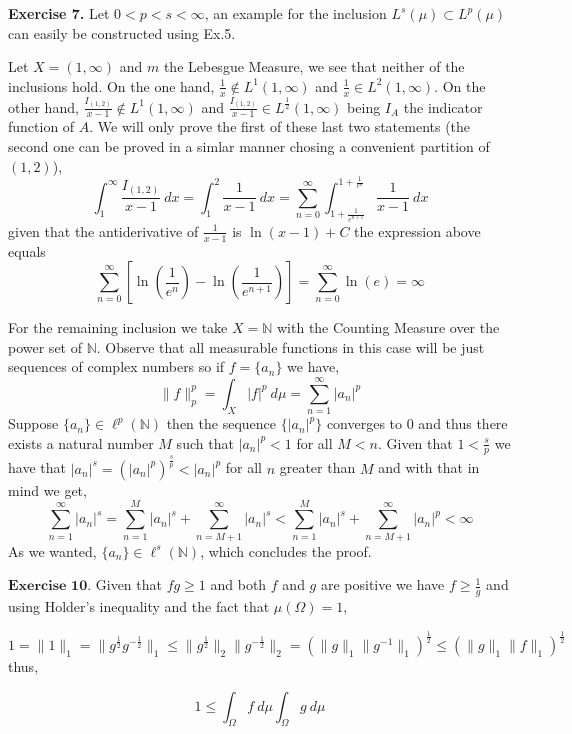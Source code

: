 \documentclass{article}
\begin{document}
\begin{exercise}\textbf{Exercise 7.}
    Let $0 < p < s < \infty$, an example for the inclusion $L^s \left(  \mu\right)  \subset L^p \left( \mu \right) $ can easily be constructed using Ex.5.

    Let $X = \left( 1, \infty \right) $ and $m$ the Lebesgue Measure, we see that neither of the inclusions hold. On the one hand, $\frac{1}{x} \notin L^1 \left( 1, \infty \right)$ and $\frac{1}{x} \in L^2 \left( 1, \infty \right) $. On the other hand, $\frac{I_{ \left( 1,2 \right) }}{ x-1} \notin L^1 \left( 1,\infty \right) $ and $\frac{I_{ \left( 1,2 \right) }}{x-1} \in L^{\frac{1}{2}} \left( 1,\infty \right) $ being $I_A$ the indicator function of $A$. We will only prove the first of these last two statements (the second one can be proved in a simlar manner chosing a convenient partition of $ \left( 1,2 \right) $),
    \[
        \int_{1}^{\infty}\frac{I_{ \left( 1,2 \right) }}{x-1} \: dx  = \int_{1}^{2} \frac{1}{x-1}\: dx = \sum_{n=0}^{\infty} \int_{1+\frac{1}{e^{n+1}}}^{1+\frac{1}{e^n}} \frac{1}{x-1}\: dx 
    \]
    given that the antiderivative of $\frac{1}{x-1}$ is $\ln \left( x-1 \right) + C$ the expression above equals
    \[
        \sum_{n=0}^{\infty} \left [\ln \left( \frac{1}{e^n} \right)  - \ln \left( \frac{1}{e^{n+1}} \right) \right] = \sum_{n=0}^{\infty} \ln \left( e \right) = \infty 
    \]

    For the remaining inclusion we take $X = \mathbb{N}$ with the Counting Measure over the power set of $\mathbb{N}$. Observe that all measurable functions in this case will be just sequences of complex numbers so if $f=\{a_n\}$ we have,
    \[
        \|f\|_p^p = \int_X |f|^p\: d\mu = \sum_{n=1}^{\infty} |a_n|^p 
    \]
    Suppose $\{a_n\} \in \ell^p \left( \mathbb{N} \right)$ then the sequence $\{|a_n|^p\}$ converges to 0 and thus there exists a natural number $M$ such that $|a_n|^p < 1$ for all $M < n$. Given that $1 < \frac{s}{p}$ we have that $|a_n|^s = \left( |a_n|^p \right)^\frac{s}{p} < |a_n|^p$ for all $n$ greater than $M$ and with that in mind we get,
    \[
       \sum_{n=1}^{\infty} |a_n|^s = \sum_{n=1}^{M} |a_n|^s + \sum_{n=M+1}^{\infty} |a_n|^s < \sum_{n=1}^{M} |a_n|^s + \sum_{n=M+1}^{\infty} |a_n|^p < \infty  
    \]
    As we wanted, $\{a_n\} \in \ell ^s \left( \mathbb{N} \right) $, which concludes the proof.
\end{exercise}

\bigbreak

\begin{exercise}$\textbf{Exercise 10.}$
Given that $fg\ge1$ and both $f$ and $g$ are positive we have $f \ge \frac{1}{g}$ and using Holder's inequality and the fact that $\mu\left(\Omega\right)=1$,

\[
    1 = \|1\|_1 = \|g^{\frac{1}{2}}g^{-\frac{1}{2}}\|_1 \le \|g^{\frac{1}{2}}\|_2 \|g^{-\frac{1}{2}}\|_2 =  \left( \|g\|_1 \|g^{-1}\|_1 \right) ^{\frac{1}{2}} \le \left(\|g\|_1 \|f\|_1 \right)^{\frac{1}{2}} 
\]
thus,

\[
    1 \le \int_\Omega f\: d\mu \int_\Omega g\: d\mu  
\]

\end{exercise}
\end{document}
